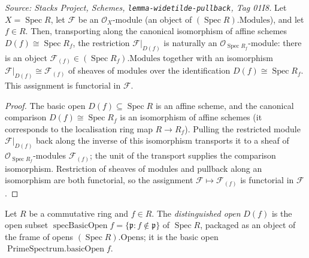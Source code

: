 \begin{lemma}
  \label{lem:modules_restrict_basicOpen}
  \textit{Source: Stacks Project, Schemes, \texttt{lemma-widetilde-pullback}, Tag 01I8.}
  Let \(X = \operatorname{Spec} R\), let \(\mathcal{F}\) be an \(\mathcal{O}_X\)-module
  (an object of \((\operatorname{Spec} R).\mathrm{Modules}\)), and let \(f \in R\). Then,
  transporting along the canonical isomorphism of affine schemes
  \(D(f) \cong \operatorname{Spec} R_f\), the restriction \(\mathcal{F}|_{D(f)}\) is naturally
  an \(\mathcal{O}_{\operatorname{Spec} R_f}\)-module: there is an object
  \(\mathcal{F}_{(f)} \in (\operatorname{Spec} R_f).\mathrm{Modules}\) together with an
  isomorphism \(\mathcal{F}|_{D(f)} \cong \mathcal{F}_{(f)}\) of sheaves of modules over the
  identification \(D(f) \cong \operatorname{Spec} R_f\). This assignment is functorial in
  \(\mathcal{F}\).
\end{lemma}
\begin{proof}
  The basic open \(D(f) \subseteq \operatorname{Spec} R\) is an affine scheme, and the
  canonical comparison \(D(f) \cong \operatorname{Spec} R_f\) is an isomorphism of affine
  schemes (it corresponds to the localisation ring map \(R \to R_f\)). Pulling the restricted
  module \(\mathcal{F}|_{D(f)}\) back along the inverse of this isomorphism transports it to a
  sheaf of \(\mathcal{O}_{\operatorname{Spec} R_f}\)-modules \(\mathcal{F}_{(f)}\); the unit of
  the transport supplies the comparison isomorphism. Restriction of sheaves of modules and
  pullback along an isomorphism are both functorial, so the assignment
  \(\mathcal{F} \mapsto \mathcal{F}_{(f)}\) is functorial in \(\mathcal{F}\).
\end{proof}

\begin{definition}\leanok
  \label{def:spec_basic_open}
  Let \(R\) be a commutative ring and \(f \in R\). The \emph{distinguished open}
  \(D(f)\) is the open subset \(\operatorname{specBasicOpen} f = \{\mathfrak{p} : f \notin
  \mathfrak{p}\}\) of \(\operatorname{Spec} R\), packaged as an object of the frame of opens
  \((\operatorname{Spec} R).\mathrm{Opens}\); it is the basic open \(\operatorname{PrimeSpectrum.basicOpen} f\).
\end{definition}

